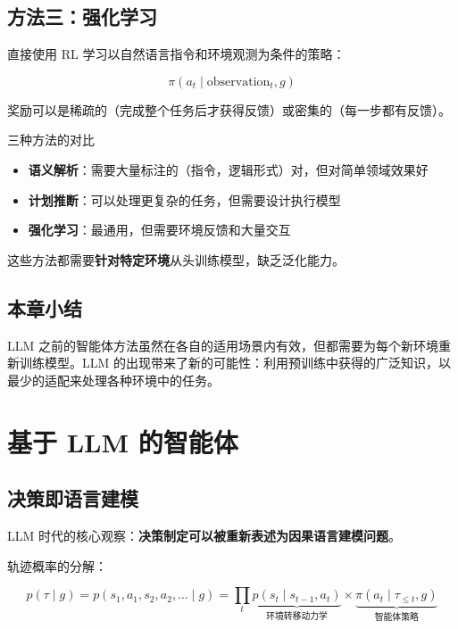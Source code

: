 \documentclass[a4paper]{article}
\begin{document}
\subsection{方法三：强化学习}

直接使用 RL 学习以自然语言指令和环境观测为条件的策略：

$$\pi(a_t \mid \text{observation}_t, g)$$

奖励可以是稀疏的（完成整个任务后才获得反馈）或密集的（每一步都有反馈）。

\begin{knowledgebox}{三种方法的对比}
\begin{itemize}
    \item \textbf{语义解析}：需要大量标注的（指令，逻辑形式）对，但对简单领域效果好
    \item \textbf{计划推断}：可以处理更复杂的任务，但需要设计执行模型
    \item \textbf{强化学习}：最通用，但需要环境反馈和大量交互
\end{itemize}
这些方法都需要\textbf{针对特定环境}从头训练模型，缺乏泛化能力。
\end{knowledgebox}

\subsection{本章小结}

LLM 之前的智能体方法虽然在各自的适用场景内有效，但都需要为每个新环境重新训练模型。LLM 的出现带来了新的可能性：利用预训练中获得的广泛知识，以最少的适配来处理各种环境中的任务。


\section{基于 LLM 的智能体}

\subsection{决策即语言建模}

LLM 时代的核心观察：\textbf{决策制定可以被重新表述为因果语言建模问题}。




轨迹概率的分解：

$$p(\tau \mid g) = p(s_1, a_1, s_2, a_2, \ldots \mid g) = \prod_t \underbrace{p(s_t \mid s_{t-1}, a_t)}_{\text{环境转移动力学}} \times \underbrace{\pi(a_t \mid \tau_{\leq t}, g)}_{\text{智能体策略}}$$
\end{document}

